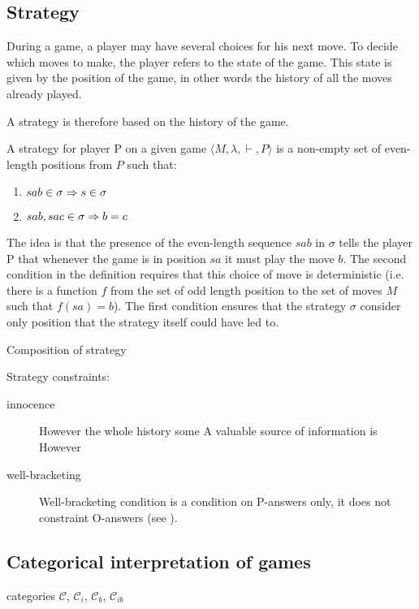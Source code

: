 \subsection{Strategy}
During a game, a player may have several choices for his next move.
To decide which moves to make, the player refers to the state of the game.
This state is given by the position of the game, in other words
the history of all the moves already played.

A strategy is therefore based on the history of the game.

\begin{dfn}[Strategy]
A strategy for player P on a given game $\langle M, \lambda, \vdash, P \rangle$ is a
non-empty set of even-length positions from $P$ such that:
\begin{enumerate}
\item $sab \in \sigma \Rightarrow s \in \sigma$
\item $sab, sac \in \sigma \Rightarrow b = c$
\end{enumerate}
\end{dfn}

The idea is that the presence of the even-length sequence $s a b$ in $\sigma$ tells the player
P that whenever the game is in position $s a$ it must play the move $b$.
The second condition in the definition requires that this choice of move is deterministic
(i.e. there is a function $f$ from the set of odd length position to the set of moves $M$
 such that $f(s a) =b$). The first condition ensures that the strategy $\sigma$ consider only
position that the strategy itself could have led to.


Composition of strategy

Strategy constraints:
\begin{description}
\item[innocence]
However the whole history
some A valuable source of information is
However

\item[well-bracketing]
Well-bracketing condition is a condition on P-answers only, it does
not constraint O-answers (see \cite{abramsky:game-semantics}).

\end{description}


\subsection{Categorical interpretation of games}

categories $\mathcal{C}$, $\mathcal{C}_i$, $\mathcal{C}_b$, $\mathcal{C}_{ib}$


